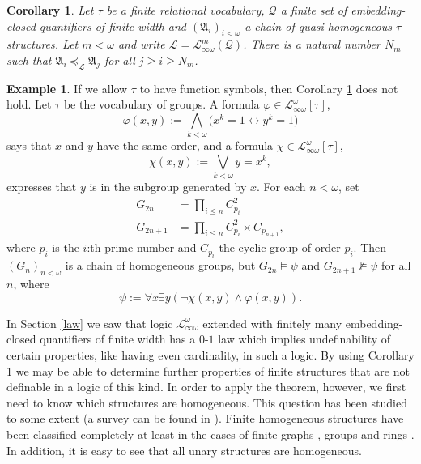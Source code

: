 \documentclass{ndjflart}
\theoremstyle{plain}
\newtheorem{corollary}[conjecture]{Corollary}
\theoremstyle{definition}
\newtheorem{example}[conjecture]{Example}
\numberwithin{equation}{section}
\begin{document}
\begin{corollary}\label{finite2}
Let $\tau$ be a finite relational vocabulary, $\mathcal{Q}$ a finite set of embed\-ding-closed quantifiers of finite width and
$(\mathfrak{A}_i)_{i<\omega}$ a chain of quasi-ho\-mo\-ge\-neous $\tau$-structures.
Let $m<\omega$ and
write $\mathcal{L} = \mathcal{L}_{\infty\omega}^m(\mathcal{Q})$.
There is a natural number $N_m$ such that
$\mathfrak{A}_i \preceq_{\mathcal{L}} \mathfrak{A}_j$ for all $j \geq i \geq N_m$.
\end{corollary}

\begin{example}\label{groups}
If we allow $\tau$ to have function symbols, then Corollary \ref{finite2} does not hold.
Let $\tau$ be the vocabulary of groups.
A formula $\varphi \in \mathcal{L}_{\infty\omega}^{\omega}[\tau]$,
\[
	\varphi(x,y) := \bigwedge_{k<\omega}\big(x^k=1 \leftrightarrow y^k=1\big)
\]
says that $x$ and $y$ have the same order, and a formula $\chi \in \mathcal{L}_{\infty\omega}^{\omega}[\tau]$,
\[
	\chi(x,y) := \bigvee_{k<\omega}y = x^k,
\]
expresses that $y$ is in the subgroup generated by $x$.
For each $n<\omega$, set
\begin{align*}
	G_{2n} &= \prod_{i\leq n} C_{p_i}^2 \\
	G_{2n+1} &= \prod_{i\leq n} C_{p_i}^2 \times C_{p_{n+1}},
\end{align*}
where $p_i$ is the $i$:th prime number and $C_{p_i}$ the cyclic group of order $p_i$.
Then $(G_n)_{n<\omega}$ is a chain of homogeneous groups, but $G_{2n} \vDash \psi$ and $G_{2n+1} \nvDash \psi$ for all $n$, where
\[
	\psi := \forall x \exists y(\neg\chi(x,y) \wedge \varphi(x,y)).
\]
\end{example}

In Section \ref{law} we saw that logic $\mathcal{L}^{\omega}_{\infty\omega}$ extended with finitely many em\-bed\-ding-closed quantifiers of finite width has a $0$-$1$ law
which implies undefinability of certain properties, like having even cardinality, in such a logic.
By using Corollary \ref{finite2} we may be able to determine further properties of finite structures that are not definable in
a logic of this kind.
In order to apply the theorem, however, we first need to know which structures are homogeneous.
This question has been studied to some extent (a survey can be found in \cite{Lachlan:1986}).
Finite homogeneous structures have been classified completely at least in the cases
of finite graphs \cite{Gardiner:1976}, groups \cite{Cherlin:2000} and rings \cite{Saracino:1988}.
In addition, it is easy to see that all unary structures are homogeneous.
\end{document}

